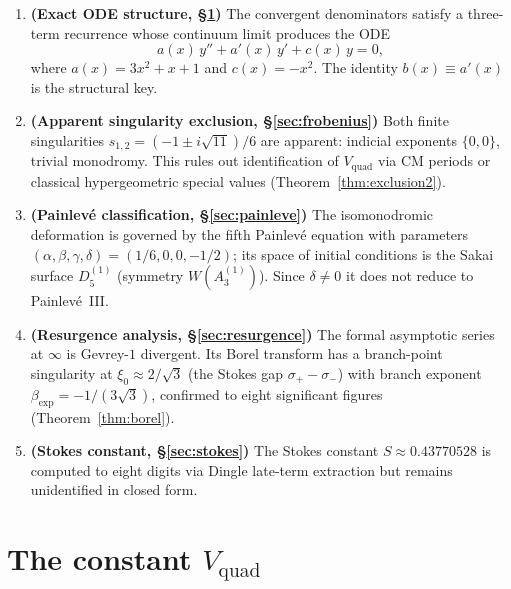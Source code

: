 \documentclass[11pt,a4paper]{article}
\theoremstyle{definition}
\theoremstyle{remark}
\newcommand{\Vq}{V_{\mathrm{quad}}}
\begin{document}
\begin{enumerate}
\item \textbf{(Exact ODE structure,
  \S\ref{sec:vquad})}
  The convergent denominators satisfy a
  three-term recurrence whose continuum
  limit produces the ODE
  \begin{equation}\label{eq:ode-intro}
    a(x)\,y'' + a'(x)\,y' + c(x)\,y = 0,
  \end{equation}
  where $a(x) = 3x^2+x+1$ and $c(x)=-x^2$.
  The identity $b(x) \equiv a'(x)$ is the
  structural key.

\item \textbf{(Apparent singularity exclusion,
  \S\ref{sec:frobenius})}
  Both finite singularities
  $s_{1,2} = (-1 \pm i\sqrt{11})/6$ are
  apparent: indicial exponents $\{0,0\}$,
  trivial monodromy. This rules out
  identification of $\Vq$ via CM periods or
  classical hypergeometric special values
  (Theorem~\ref{thm:exclusion2}).

\item \textbf{(Painlev\'e classification,
  \S\ref{sec:painleve})}
  The isomonodromic deformation is governed
  by the fifth Painlev\'e equation with
  parameters $(\alpha,\beta,\gamma,\delta)
  = (1/6, 0, 0, -1/2)$; its space of initial
  conditions is the Sakai surface $D_5^{(1)}$
  (symmetry $W(A_3^{(1)})$). Since
  $\delta\neq0$ it does not reduce to
  Painlev\'e~III.

\item \textbf{(Resurgence analysis,
  \S\ref{sec:resurgence})}
  The formal asymptotic series at $\infty$ is
  Gevrey-$1$ divergent. Its Borel transform
  has a branch-point singularity at
  $\xi_0 \approx 2/\sqrt{3}$ (the Stokes gap
  $\sigma_+ - \sigma_-$) with branch exponent
  $\beta_{\mathrm{exp}} = -1/(3\sqrt{3})$,
  confirmed to eight significant figures
  (Theorem~\ref{thm:borel}).

\item \textbf{(Stokes constant,
  \S\ref{sec:stokes})}
  The Stokes constant $S \approx 0.43770528$
  is computed to eight digits via
  Dingle late-term extraction but remains
  unidentified in closed form.
\end{enumerate}


\section{The constant $\Vq$}\label{sec:vquad}
\end{document}
